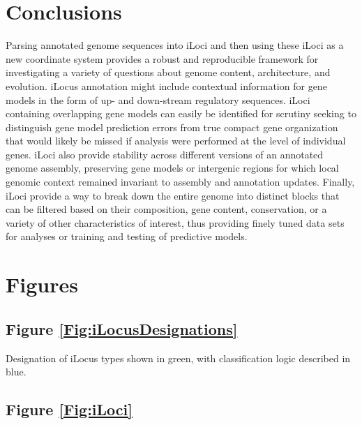 \section{Conclusions}

Parsing annotated genome sequences into iLoci and then using these iLoci as a new coordinate system provides a robust and reproducible framework for investigating a variety of questions about genome content, architecture, and evolution.
iLocus annotation might include contextual information for gene models in the form of up- and down-stream regulatory sequences.
iLoci containing overlapping gene models can easily be identified for scrutiny seeking to distinguish gene model prediction errors from true compact gene organization that would likely be missed if analysis were performed at the level of individual genes.
iLoci also provide stability across different versions of an annotated genome assembly, preserving gene models or intergenic regions for which local genomic context remained invariant to assembly and annotation updates.
Finally, iLoci provide a way to break down the entire genome into distinct blocks that can be filtered based on their composition, gene content, conservation, or a variety of other characteristics of interest, thus providing finely tuned data sets for analyses or training and testing of predictive models.


\newpage
\section{Figures} %

\subsection*{Figure \ref{Fig:iLocusDesignations}}

\noindent
Designation of iLocus types shown in green, with classification logic described in blue.

\subsection*{Figure \ref{Fig:iLoci}}


